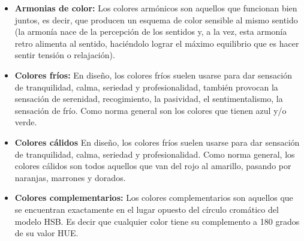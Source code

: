 \begin{itemize}
	\item \textbf{Armonias de color:} Los colores armónicos son aquellos que funcionan bien juntos, es decir, que producen un esquema de color sensible al mismo sentido (la armonía nace de la percepción de los sentidos y, a la vez, esta armonía retro alimenta al sentido, haciéndolo lograr el máximo equilibrio que es hacer sentir tensión o relajación). 
	
	\item \textbf{Colores fríos:} En diseño, los colores fríos suelen usarse para dar sensación de tranquilidad, calma, seriedad y profesionalidad, también provocan la sensación de serenidad, recogimiento, la pasividad, el sentimentalismo, la sensación de frío. Como norma general son los colores que tienen azul y/o verde.
	
	\item \textbf{Colores cálidos} En diseño, los colores fríos suelen usarse para dar sensación de tranquilidad, calma, seriedad y profesionalidad. Como norma general, los colores cálidos son todos aquellos que van del rojo al amarillo, pasando por naranjas, marrones y dorados. 
	
	\item \textbf{Colores complementarios:}	Los colores complementarios son aquellos que se encuentran exactamente en el lugar opuesto del círculo cromático del modelo HSB. Es decir que cualquier color tiene su complemento a 180 grados de su valor HUE.
	
\end{itemize}





